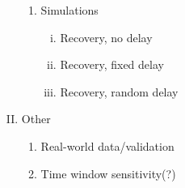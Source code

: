 \documentclass[12pt, letterpaper, twoside]{article}
\begin{document}
\begin{enumerate}[I.]
\begin{enumerate}[1.]
  \item Simulations
    \begin{enumerate}[i.]
    \item Recovery, no delay
    \item Recovery, fixed delay
    \item Recovery, random delay
    \end{enumerate}
  \end{enumerate}
\item Other
  \begin{enumerate}[1.]
  \item Real-world data/validation
  \item Time window sensitivity(?)
  \end{enumerate}
\end{enumerate}
\end{document}
